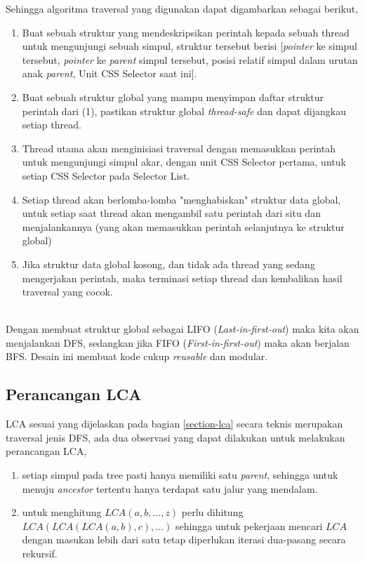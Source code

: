 \documentclass[12pt,a4paper]{article}
\begin{document}
\begin{itemize}
Sehingga algoritma traversal yang digunakan dapat digambarkan sebagai berikut,
\begin{enumerate}
    \item Buat sebuah struktur yang mendeskripsikan perintah kepada sebuah thread untuk mengunjungi sebuah simpul, struktur tersebut berisi [\textit{pointer} ke simpul tersebut, \textit{pointer} ke \textit{parent} simpul tersebut, posisi relatif simpul dalam urutan anak \textit{parent}, Unit CSS Selector saat ini].
    \item Buat sebuah struktur global yang mampu menyimpan daftar struktur perintah dari (1), pastikan struktur global \textit{thread-safe} dan dapat dijangkau setiap thread.
    \item Thread utama akan menginisiasi traversal dengan memasukkan perintah untuk mengunjungi simpul akar, dengan unit CSS Selector pertama, untuk setiap CSS Selector pada Selector List.
    \item Setiap thread akan berlomba-lomba "menghabiskan" struktur data global, untuk setiap saat thread akan mengambil satu perintah dari situ dan menjalankannya (yang akan memasukkan perintah selanjutnya ke struktur global)
    \item Jika struktur data global kosong, dan tidak ada thread yang sedang mengerjakan perintah, maka terminasi setiap thread dan kembalikan hasil traversal yang cocok.
\end{enumerate} \\

Dengan membuat struktur global sebagai LIFO (\textit{Last-in-first-out}) maka kita akan menjalankan DFS, 
sedangkan jika FIFO (\textit{First-in-first-out}) maka akan berjalan BFS. Desain ini membuat kode cukup \textit{reusable} dan modular. \\


\subsection{Perancangan LCA} \label{section-lca-design}

LCA sesuai yang dijelaskan pada bagian \ref{section-lca} secara teknis merupakan traversal jenis DFS, 
ada dua observasi yang dapat dilakukan untuk melakukan perancangan LCA,
\begin{enumerate}  
    \item setiap simpul pada tree pasti hanya memiliki satu \textit{parent}, sehingga untuk menuju \textit{ancestor} tertentu hanya terdapat satu jalur yang mendalam.
    \item untuk menghitung $LCA(a, b, \dots, z)$ perlu dihitung $LCA(LCA(LCA(a, b), c), \dots)$ sehingga untuk pekerjaan mencari $LCA$ dengan masukan lebih dari satu tetap diperlukan iterasi dua-pasang secara rekursif.
\end{enumerate} \\


\end{itemize}
\end{document}
